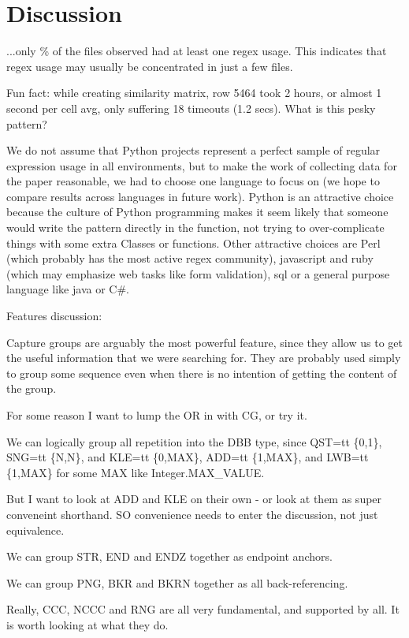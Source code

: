 \section{Discussion}
\label{sec:discussion}
...only \% of the files observed had at least one regex usage.  This indicates that regex usage may usually be concentrated in just a few files.


Fun fact: while creating similarity matrix, row 5464 took 2 hours, or almost 1 second per cell avg, only suffering 18 timeouts (1.2 secs).  What is this pesky pattern?

We do not assume that Python projects represent a perfect sample of regular expression usage in all environments, but to make the work of collecting data for the paper reasonable, we had to choose one language to focus on (we hope to compare results across languages in future work).  Python is an attractive choice because the culture of Python programming makes it seem likely that someone would write the pattern directly in the function, not trying to over-complicate things with some extra Classes or functions.  Other attractive choices are Perl (which probably has the most active regex community), javascript and ruby (which may emphasize web tasks like form validation), sql or a general purpose language like java or C\#.

Features discussion:

Capture groups are arguably the most powerful feature, since they allow us to get the useful information that we were searching for.  They are probably used simply to group some sequence even when there is no intention of getting the content of the group.

For some reason I want to lump the OR in with CG, or try it.

We can logically group all repetition into the DBB type, since QST={tt \{0,1\}}, SNG={tt \{N,N\}}, and KLE={tt \{0,MAX\}}, ADD={tt \{1,MAX\}}, and LWB={tt \{1,MAX\}} for some MAX like Integer.MAX\_VALUE.

But I want to look at ADD and KLE on their own - or look at them as super conveneint shorthand.  SO convenience needs to enter the discussion, not just equivalence.

We can group STR, END and ENDZ together as endpoint anchors.

We can group PNG, BKR and BKRN together as all back-referencing.

Really, CCC, NCCC and RNG are all very fundamental, and supported by all.  It is worth looking at what they do.

